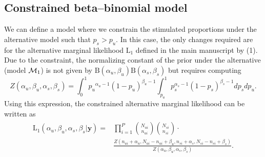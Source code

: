\documentclass{article}
\begin{document}
\subsection{Constrained beta--binomial model}
\label{supp:constrained}
We can define a model where we constrain the stimulated proportions under the alternative model such that $p_s>p_u$. In this case, the only changes required are for the alternative marginal likelihood $\mathrm{L}_1$ defined in the main manuscript by (1). Due to the constraint, the normalizing constant of the prior under the alternative (model ${\cal M}_1$) is not given by $\mathrm{B}(\alpha_u,\beta_u)\mathrm{B}(\alpha_s,\beta_s)$ but requires computing \[
Z(\alpha_u, \beta_u, \alpha_s, \beta_s)=\int_{0}^1{p_u}^{\alpha_u-1}(1-p_u)^{\beta_u-1}\int_{p_u}^1 p_s^{\alpha_s-1}(1-p_s)^{\beta_s-1}dp_sdp_u.
\]
Using this expression, the constrained alternative marginal likelihood can be written as 
\begin{align}
	\begin{split}
\mathrm{L}_1(\alpha_u,\beta_u,\alpha_s,\beta_s|\mathbf{y}) 
=&\prod_{i=1}^P\binom{N_{ui}}{n_{ui}} \binom{N_{si}}{n_{si}}\cdot\\ &\frac{Z(n_{ui}+\alpha_u,N_{ui}-n_{ui}+\beta_u,n_{si}+\alpha_s,N_{si}-n_{si}+\beta_s)}{Z(\alpha_u,\beta_u,\alpha_s,\beta_s)}.\\
\label{model2:constrained}
\end{split}
\end{align}
\end{document}
